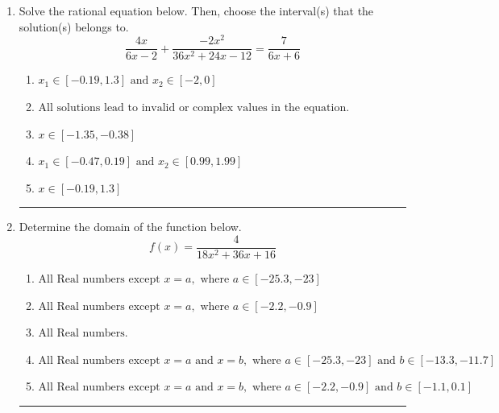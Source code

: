 \documentclass[14pt]{extbook}
\newcommand{\litem}[1]{\item#1\hspace*{-1cm}\rule{\textwidth}{0.4pt}}
\begin{document}
\begin{enumerate}
{\begin{enumerate}[label=\Alph*.]
\end{enumerate} }
\litem{
Solve the rational equation below. Then, choose the interval(s) that the solution(s) belongs to.\[ \frac{4x}{6x -2} + \frac{-2x^{2}}{36x^{2} +24 x -12} = \frac{7}{6x + 6} \]\begin{enumerate}[label=\Alph*.]
\item \( x_1 \in [-0.19, 1.3] \text{ and } x_2 \in [-2,0] \)
\item \( \text{All solutions lead to invalid or complex values in the equation.} \)
\item \( x \in [-1.35,-0.38] \)
\item \( x_1 \in [-0.47, 0.19] \text{ and } x_2 \in [0.99,1.99] \)
\item \( x \in [-0.19,1.3] \)

\end{enumerate} }
\litem{
Determine the domain of the function below.\[ f(x) = \frac{4}{18x^{2} +36 x + 16} \]\begin{enumerate}[label=\Alph*.]
\item \( \text{All Real numbers except } x = a, \text{ where } a \in [-25.3, -23] \)
\item \( \text{All Real numbers except } x = a, \text{ where } a \in [-2.2, -0.9] \)
\item \( \text{All Real numbers.} \)
\item \( \text{All Real numbers except } x = a \text{ and } x = b, \text{ where } a \in [-25.3, -23] \text{ and } b \in [-13.3, -11.7] \)
\item \( \text{All Real numbers except } x = a \text{ and } x = b, \text{ where } a \in [-2.2, -0.9] \text{ and } b \in [-1.1, 0.1] \)


\end{enumerate}}
\end{enumerate}
\end{document}
